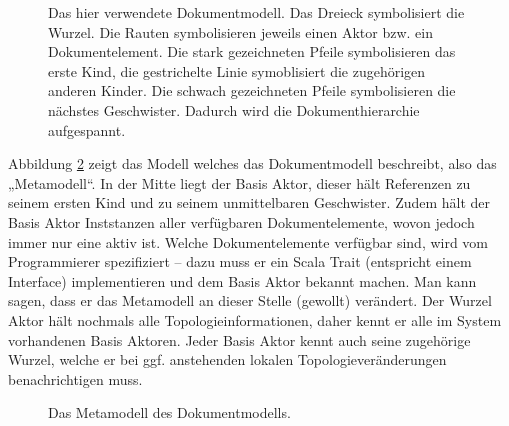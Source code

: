  
\begin{figure}[h!]
\centering
\advance\leftskip-2.5cm
\caption{ Das hier verwendete Dokumentmodell. Das Dreieck symbolisiert die Wurzel. Die Rauten symbolisieren jeweils einen Aktor bzw. ein Dokumentelement. Die stark gezeichneten Pfeile symbolisieren das erste Kind, die gestrichelte Linie symoblisiert die zugehörigen anderen Kinder. Die schwach gezeichneten Pfeile symbolisieren die nächstes Geschwister. Dadurch wird die Dokumenthierarchie aufgespannt. }\label{docmodell}
\end{figure}
 
Abbildung \ref{metamodell} zeigt das Modell welches das Dokumentmodell beschreibt, also das „Metamodell“. In der Mitte liegt der Basis Aktor, dieser hält Referenzen zu seinem ersten Kind und zu seinem unmittelbaren Geschwister. Zudem hält der Basis Aktor Inststanzen aller verfügbaren Dokumentelemente, wovon jedoch immer nur eine aktiv ist. Welche Dokumentelemente verfügbar sind, wird vom Programmierer spezifiziert -- dazu muss er ein Scala Trait (entspricht einem Interface) implementieren und dem Basis Aktor bekannt machen. Man kann sagen, dass er das Metamodell an dieser Stelle (gewollt) verändert. Der Wurzel Aktor hält nochmals alle Topologieinformationen, daher kennt er alle im System vorhandenen Basis Aktoren. Jeder Basis Aktor kennt auch seine zugehörige Wurzel, welche er bei ggf. anstehenden lokalen Topologieveränderungen benachrichtigen muss.

 
\begin{figure}[h!]
\centering
\advance\leftskip-2.5cm
\caption{ Das Metamodell des Dokumentmodells. }\label{metamodell}
\end{figure}
 
